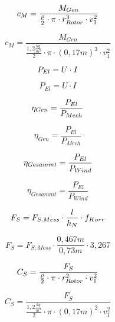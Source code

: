 \begin{equation}
    \centering
    c_M = \frac{M_{Gen}}{ \frac{\rho}{2} \cdot \pi \cdot r_{Rotor}^3 \cdot v_1^2}
    \label{eq:230615_Momentenbeiwert}
\end{equation}

$$c_M = \frac{M_{Gen}}{ \frac{1,2 \frac{kg}{m^3}}{2} \cdot \pi \cdot (0,17 m)^3 \cdot v_1^2}$$

\begin{equation}
    \centering
    P_{El} = U \cdot I
    \label{eq:230615_Elektrische_Leistung}
\end{equation}

$$P_{El} = U \cdot I$$



\begin{equation}
    \centering
    \eta_{Gen} = \frac{P_{El}}{P_{Mech}}
    \label{eq:230615_Generatorwirkungsgrad}
\end{equation}

$$\eta_{Gen} = \frac{P_{El}}{P_{Mech}}$$

\begin{equation}
    \centering
    \eta_{Gesammt} = \frac{P_{El}}{P_{Wind}}
    \label{eq:230615_Gesammtwirkungsgrad}
\end{equation}

$$\eta_{Gesammt} = \frac{P_{El}}{P_{Wind}}$$

\begin{equation}
    \centering
    F_S = F_{S,Mess} \cdot \frac{l}{h_N} \cdot f_{Korr}
    \label{eq:230615_Schubkraft}
\end{equation}

$$F_S = F_{S,Mess} \cdot \frac{0,467m}{0,73m} \cdot 3,267$$

\begin{equation}
    \centering
    C_S = \frac{F_S}{\frac{\rho}{2} \cdot \pi \cdot r_{Rotor}^2 \cdot v_1^2}
    \label{eq:230615_Schubbeiwert}
\end{equation}

$$C_S = \frac{F_S}{\frac{1,2 \frac{kg}{m^3}}{2} \cdot \pi \cdot (0,17 m)^2 \cdot v_1^2}$$